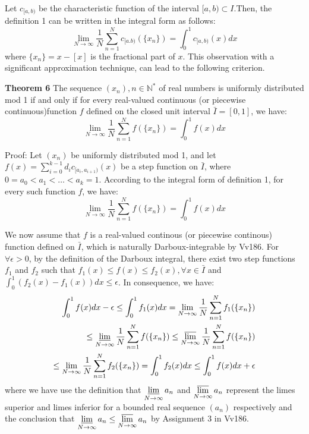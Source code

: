\documentclass[12pt]{article}
\begin{document}
\par Let $c_{[a,b)}$ be the characteristic function of the interval $[a,b)\subset I$.Then, the  definition 1 can be written in the integral form as follows:
\begin{equation*}
\lim_{N\to\infty}\frac{1}{N}\sum_{n=1}^{N}c_{[a.b)} (\{x_n\})=\int_{0}^{1}c_{[a,b)}(x)dx
\end{equation*}
where $\{x_n\}=x-[x]$ is the fractional part of $x$.
This observation with a significant approximation technique, can lead to the following criterion.
\par {\textbf{Theorem 6}} The sequence $(x_n), n\in \mathbb{N^*}$ of real numbers is uniformly distributed mod 1 if and only if for every real-valued continuous (or piecewise continuous)function $f$ defined on the closed unit interval $\bar{I}=[0,1]$, we have:
\begin{equation*}
\lim_{N\to\infty}\frac{1}{N}\sum_{n=1}^{N}f(\{x_n\})=\int_{0}^{1}f(x)dx
\end{equation*}
\par Proof: Let $(x_n)$ be uniformly distributed mod 1, and let $f(x)=\sum\limits_{i=0}^{k-1}d_ic_{[a_i,a_{i+1})}(x)$ be a step function on $\bar{I}$, where $0=a_0<a_1<\ldots<a_k=1$. According to the integral form of definition 1, for every such function $f$, we have:
\begin{equation*}
\lim_{N\to\infty}\frac{1}{N}\sum_{n=1}^{N}f(\{x_n\})=\int_{0}^{1}f(x)dx
\end{equation*}
\par We now assume that $f$ is a real-valued continous (or piecewise continous) function defined on $\bar{I}$, which is naturally Darboux-integrable by Vv186. For $\forall \epsilon >0$, by the definition of the Darboux integral, there exist two step functions $f_1$ and $f_2$ such that $f_1(x)\leq f(x)\leq f_2(x), \forall x \in \bar{I}$ and $\int_{0}^{1}(f_2(x)-f_1(x))dx\leq\epsilon$. In consequence, we have:
\[
\begin{split}
\int_{0}^{1}f(x)dx-\epsilon\leq\int_{0}^{1}f_1(x)dx=\lim_{N\to\infty}\frac{1}{N}\sum_{n=1}^{N}f_1(\{x_n\}) \\
\leq \varliminf_{N\to\infty}\frac{1}{N}\sum_{n=1}^{N}f(\{x_n\})\leq \varlimsup_{N\to \infty}\frac{1}{N}\sum_{n=1}^{N}f(\{x_n\}) \\
\leq \lim_{N\to \infty}\frac{1}{N}\sum_{n=1}^{N}f_2(\{x_n\})=\int_{0}^{1}f_2(x)dx\leq \int_{0}^{1}f(x)dx+\epsilon
\end{split}
\]
where we have use the definition that $\varliminf\limits_{N\to\infty} a_n$ and $\varlimsup\limits_{N\to\infty} a_n$ represent the limes superior and limes inferior for a bounded real sequence $(a_n)$ respectively and the conclusion that $\varliminf\limits_{N\to\infty} a_n \leq \varlimsup\limits_{N\to\infty} a_n$ by Assignment 3 in Vv186.
\end{document}
